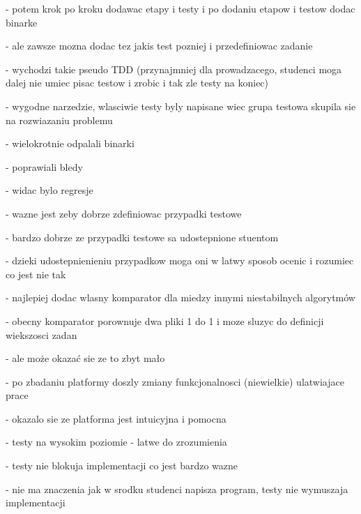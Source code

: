 - potem krok po kroku dodawac etapy i testy i po dodaniu etapow i testow dodac binarke

- ale zawsze mozna dodac tez jakis test pozniej i przedefiniowac zadanie

- wychodzi takie pseudo TDD (przynajmniej dla prowadzacego, studenci moga dalej nie umiec pisac testow i zrobic i tak zle testy na koniec)

- wygodne narzedzie, wlasciwie testy byly napisane wiec grupa testowa skupila sie na rozwiazaniu problemu

- wielokrotnie odpalali binarki

- poprawiali bledy

- widac bylo regresje

- wazne jest zeby dobrze zdefiniowac przypadki testowe

- bardzo dobrze ze przypadki testowe sa udostepnione stuentom

- dzieki udostepnienieniu przypadkow moga oni w latwy sposob ocenic i rozumiec co jest nie tak

- najlepiej dodac wlasny komparator dla miedzy innymi niestabilnych algorytmów

- obecny komparator porownuje dwa pliki 1 do 1 i moze sluzyc do definicji wiekszosci zadan

- ale może okazać sie ze to zbyt mało

- po zbadaniu platformy doszly zmiany funkcjonalnosci (niewielkie) ulatwiajace prace

- okazalo sie ze platforma jest intuicyjna i pomocna

- testy na wysokim poziomie - latwe do zrozumienia

- testy nie blokuja implementacji co jest bardzo wazne

- nie ma znaczenia jak w srodku studenci napisza program, testy nie wymuszaja implementacji




